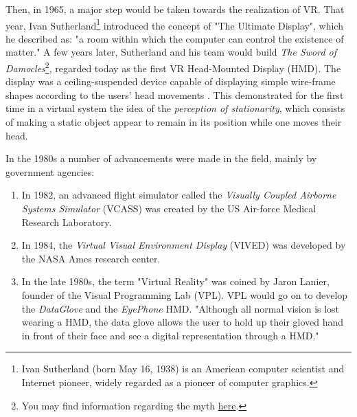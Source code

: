 Then, in 1965, a major step would be taken towards the realization of VR. That year, Ivan Sutherland\footnote{Ivan Sutherland (born May 16, 1938) is an American computer scientist and Internet pioneer, widely regarded as a pioneer of computer graphics.} introduced the concept of "The Ultimate Display", which he described as: "a room within which the computer can control the existence of matter." \cite{sutherland1965ultimate} A few years later, Sutherland and his team would build \textit{The Sword of Damocles}\footnote{You may find information regarding the myth \href{https://www.history.com/news/what-was-the-sword-of-damocles}{here}.}, regarded today as the first VR Head-Mounted Display (HMD). The display was a ceiling-suspended device capable of displaying simple wire-frame shapes according to the users' head movements \cite{hemstrom2020comparison}. This demonstrated for the first time in a virtual system the idea of the \textit{perception of stationarity}, which consists of making a static object appear to remain in its position while one moves their head. 

In the 1980s a number of advancements were made in the field, mainly by government agencies:

\begin{enumerate}
    \item In 1982, an advanced flight simulator called the \textit{Visually Coupled Airborne Systems Simulator} (VCASS) was created by the US Air-force Medical Research Laboratory.
    \item In 1984, the \textit{Virtual Visual Environment Display} (VIVED) was developed by the NASA Ames research center. 
    \item In the late 1980s, the term "Virtual Reality" was coined by Jaron Lanier, founder of the Visual Programming Lab (VPL). VPL would go on to develop the \textit{DataGlove} and the \textit{EyePhone} HMD. "Although all normal vision is lost wearing a HMD, the data glove allows the user to hold up their gloved hand in front of their face and see a digital representation through a HMD." \cite{dixon2006history}
\end{enumerate}

